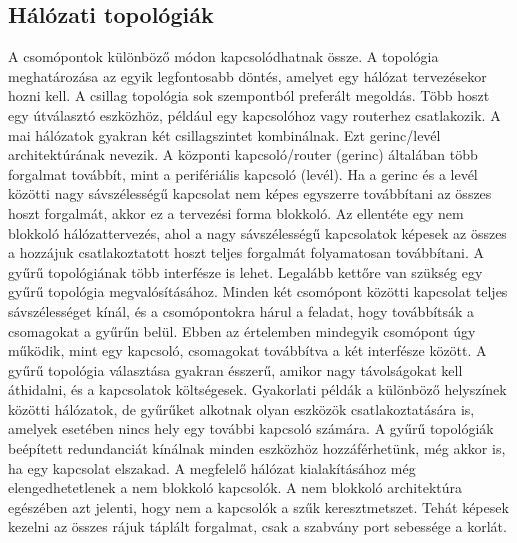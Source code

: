 \subsection{Hálózati topológiák}
A csomópontok különböző módon kapcsolódhatnak össze. A topológia meghatározása
az egyik legfontosabb döntés, amelyet egy hálózat tervezésekor hozni kell. A
csillag topológia sok szempontból preferált megoldás. Több hoszt egy
útválasztó eszközhöz, például egy kapcsolóhoz vagy routerhez csatlakozik. A mai
hálózatok gyakran két csillagszintet kombinálnak. Ezt gerinc/levél architektúrának
nevezik. A központi kapcsoló/router (gerinc) általában több forgalmat továbbít,
mint a perifériális kapcsoló (levél). Ha a gerinc és a levél közötti nagy sávszélességű
kapcsolat nem képes egyszerre továbbítani az összes hoszt forgalmát, akkor ez a
tervezési forma blokkoló. Az ellentéte egy nem blokkoló hálózattervezés, ahol a
nagy sávszélességű kapcsolatok képesek az összes a hozzájuk csatlakoztatott
hoszt teljes forgalmát folyamatosan továbbítani. 
A gyűrű topológiának több interfésze is lehet.
Legalább kettőre van szükség egy gyűrű topológia megvalósításához. Minden két
csomópont közötti kapcsolat teljes sávszélességet kínál, és a csomópontokra
hárul a feladat, hogy továbbítsák a csomagokat a gyűrűn belül. Ebben az
értelemben mindegyik csomópont úgy működik, mint egy kapcsoló, csomagokat
továbbítva a két interfésze között. A gyűrű topológia választása gyakran ésszerű,
amikor nagy távolságokat kell áthidalni, és a kapcsolatok költségesek.
Gyakorlati példák a különböző helyszínek közötti hálózatok, de gyűrűket alkotnak
olyan eszközök csatlakoztatására is, amelyek esetében nincs hely egy további
kapcsoló számára. A gyűrű topológiák beépített redundanciát kínálnak minden
eszközhöz hozzáférhetünk, még akkor is, ha egy kapcsolat elszakad.
A megfelelő hálózat kialakításához még elengedhetetlenek a nem blokkoló kapcsolók.
A nem blokkoló architektúra egészében azt jelenti, hogy nem a kapcsolók a szűk keresztmetszet.
Tehát képesek kezelni az összes rájuk táplált forgalmat, csak a szabvány port sebessége a korlát.
